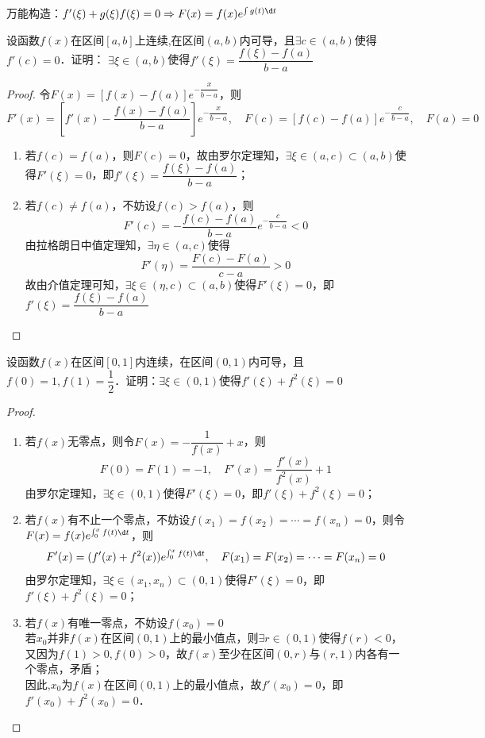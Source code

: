 \documentclass[12pt, a4paper, oneside, UTF8]{ctexbook}
\begin{document}
\begin{myRemark}
    万能构造：$f'(\xi)+g(\xi)f(\xi)=0 \Rightarrow F(x)=f(x)e^{\int g(t) \d t}$
\end{myRemark}
\begin{exercise}
    设函数$f(x)$在区间$[a,b]$上连续,在区间$(a,b)$内可导，且$\exists c \in (a,b)$使得$f'(c)=0$．证明：
    $\exists \xi \in (a,b)$使得$f'(\xi)=\dfrac{f(\xi)-f(a)}{b-a}$
\end{exercise}
\begin{proof}
    令$F(x)=[f(x)-f(a)]e^{-\dfrac{x}{b-a}}$，则
    \[
        F'(x)=\left[f'(x)-\dfrac{f(x)-f(a)}{b-a}\right]e^{-\dfrac{x}{b-a}}, \quad F(c)= \left[f(c)-f(a)\right]e^{-\dfrac{c}{b-a}}, \quad F(a)=0
    \]
    \begin{enumerate}[label=\roman*).]
        \item 若$f(c)=f(a)$，则$F(c)=0$，故由罗尔定理知，$\exists \xi \in (a,c) \subset (a,b)$使得$F'(\xi)=0$，即$f'(\xi)=\dfrac{f(\xi)-f(a)}{b-a}$；
        \item 若$f(c)\neq f(a)$，不妨设$f(c) > f(a)$，则
        \[
            F'(c) = -\dfrac{f(c)-f(a)}{b-a}e^{-\dfrac{c}{b-a}} < 0
        \]
        由拉格朗日中值定理知，$\exists \eta \in (a,c)$使得
        \[
            F'(\eta) = \dfrac{F(c)-F(a)}{c-a} > 0
        \]
        故由介值定理可知，$\exists \xi \in (\eta,c) \subset (a,b)$使得$F'(\xi)=0$，即$f'(\xi)=\dfrac{f(\xi)-f(a)}{b-a}$
    \end{enumerate}
\end{proof}
\begin{exercise}
    设函数$f(x)$在区间$[0,1]$内连续，在区间$(0,1)$内可导，且$f(0)=1,f(1)=\dfrac{1}{2}$．证明：$\exists \xi \in (0,1)$使得$f'(\xi) + f^2 (\xi) =0$
\end{exercise}
\begin{proof}
    \begin{enumerate}[label=\roman*).]
        \item 若$f(x)$无零点，则令$F(x)=-\dfrac{1}{f(x)}+x$，则
        \[
           F(0)=F(1)=-1 , \quad F'(x)=\dfrac{f'(x)}{f^2 (x)} + 1
        \]
        由罗尔定理知，$\exists \xi \in (0,1)$使得$F'(\xi)=0$，即$f'(\xi) + f^2 (\xi) =0$；
        \item 若$f(x)$有不止一个零点，不妨设$f(x_1)=f(x_2)=\cdots = f(x_n)=0$，则令$F(x)=f(x)e^{\int_{0}^{x} f(t) \d t}$，则
        \[
            F'(x)=(f'(x)+f^2 (x))e^{\int_{0}^{x} f(t) \d t}, \quad F(x_1)= F(x_2)=\cdots = F(x_n)=0
        \]
        由罗尔定理知，$\exists \xi \in (x_1,x_n) \subset (0,1)$使得$F'(\xi)=0$，即$f'(\xi) + f^2 (\xi) =0$；
        \item 若$f(x)$有唯一零点，不妨设$f(x_0)=0$\\
        若$x_0$并非$f(x)$在区间$(0,1)$上的最小值点，则$\exists r \in (0,1)$使得$f(r) < 0$，又因为$f(1) >0,f(0) >0$，故$f(x)$至少在区间$(0,r)$与$(r,1)$内各有一个零点，矛盾；\\
        因此,$x_0$为$f(x)$在区间$(0,1)$上的最小值点，故$f'(x_0)=0$，即$f'(x_0) + f^2 (x_0) =0$．
    \end{enumerate}
\end{proof}
\end{document}
